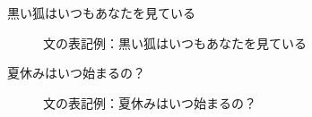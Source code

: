 \documentclass[../../main-detail.tex]{subfiles}
\begin{document}
\begin{exe}
  \ex {}
  \glt 黒い狐はいつもあなたを見ている
\end{exe}
\begin{figure}[H]
  \centering
  \caption{文の表記例：黒い狐はいつもあなたを見ている}
  \label{fig:maliitasuy-example-fox}
\end{figure}

\begin{exe}
  \ex {}
  \glt 夏休みはいつ始まるの？
\end{exe}
\begin{figure}[H]
  \centering
  \caption{文の表記例：夏休みはいつ始まるの？}
  \label{fig:maliitasuy-example-summer}
\end{figure}
\end{document}
